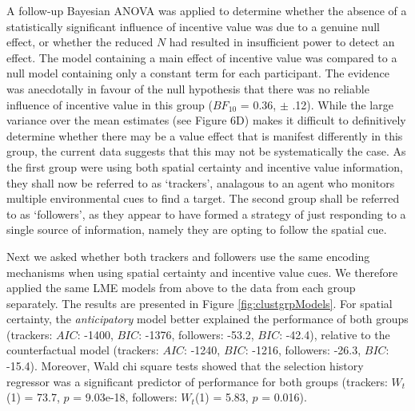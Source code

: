 \documentclass[11pt,halfline,a4paper,]{ouparticle}
\begin{document}
A follow-up Bayesian ANOVA was applied to determine whether the absence of a statistically significant influence of incentive value was due to a genuine null effect, or whether the reduced \(N\) had resulted in insufficient power to detect an effect. The model containing a main effect of incentive value was compared to a null model containing only a constant term for each participant. The evidence was anecdotally in favour of the null hypothesis that there was no reliable influence of incentive value in this group (\(BF_{10}\) = 0.36, \(\pm\) .12). While the large variance over the mean estimates (see Figure 6D) makes it difficult to definitively determine whether there may be a value effect that is manifest differently in this group, the current data suggests that this may not be systematically the case. As the first group were using both spatial certainty and incentive value information, they shall now be referred to as `trackers', analagous to an agent who monitors multiple environmental cues to find a target. The second group shall be referred to as `followers', as they appear to have formed a strategy of just responding to a single source of information, namely they are opting to follow the spatial cue.

Next we asked whether both trackers and followers use the same encoding mechanisms when using spatial certainty and incentive value cues. We therefore applied the same LME models from above to the data from each group separately. The results are presented in Figure \ref{fig:clustgrpModels}. For spatial certainty, the \emph{anticipatory} model better explained the performance of both groups (trackers: \(AIC\): -1400, \(BIC\): -1376, followers: -53.2, \(BIC\): -42.4), relative to the counterfactual model (trackers: \(AIC\): -1240, \(BIC\): -1216, followers: -26.3, \(BIC\): -15.4). Moreover, Wald chi square tests showed that the selection history regressor was a significant predictor of performance for both groups (trackers: \(W_{t}\)(1) = 73.7, \(p\) = 9.03e-18, followers: \(W_{t}\)(1) = 5.83, \(p\) = 0.016).
\end{document}
